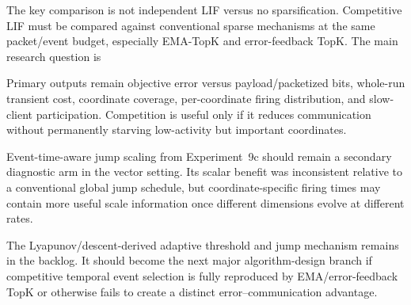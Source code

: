 The key comparison is not independent LIF versus no sparsification. Competitive LIF must be compared against conventional sparse mechanisms at the same packet/event budget, especially EMA-TopK and error-feedback TopK. The main research question is
\begin{center}
\end{center}

Primary outputs remain objective error versus payload/packetized bits, whole-run transient cost, coordinate coverage, per-coordinate firing distribution, and slow-client participation. Competition is useful only if it reduces communication without permanently starving low-activity but important coordinates.

Event-time-aware jump scaling from Experiment~9c should remain a secondary diagnostic arm in the vector setting. Its scalar benefit was inconsistent relative to a conventional global jump schedule, but coordinate-specific firing times may contain more useful scale information once different dimensions evolve at different rates.

The Lyapunov/descent-derived adaptive threshold and jump mechanism remains in the backlog. It should become the next major algorithm-design branch if competitive temporal event selection is fully reproduced by EMA/error-feedback TopK or otherwise fails to create a distinct error--communication advantage.
